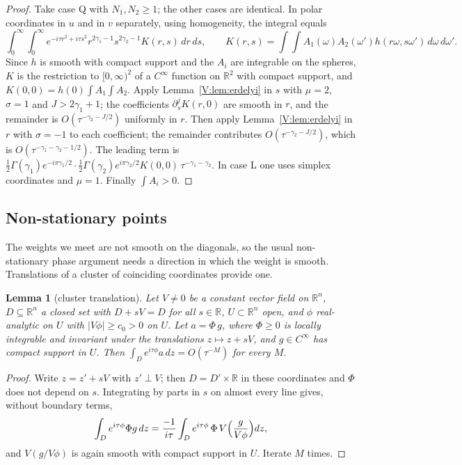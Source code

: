 \documentclass[11pt,a4paper]{article}
\newtheorem{lemma}[theorem]{Lemma}
\theoremstyle{definition}
\theoremstyle{remark}
\newcommand{\R}{\mathbb R}
\numberwithin{equation}{section}
\begin{document}
\begin{proof}
Take case Q with $N_1,N_2\ge1$; the other cases are identical. In polar coordinates in $u$ and in $v$ separately, using homogeneity, the integral equals
\[
\int_0^\infty\!\!\int_0^\infty e^{-i\tau r^2+i\tau s^2}r^{2\gamma_1-1}s^{2\gamma_2-1}K(r,s)\,dr\,ds,\qquad K(r,s)=\int\!\!\int A_1(\omega)A_2(\omega')h(r\omega,s\omega')\,d\omega\,d\omega'.
\]
Since $h$ is smooth with compact support and the $A_i$ are integrable on the spheres, $K$ is the restriction to $[0,\infty)^2$ of a $C^\infty$ function on $\R^2$ with compact support, and $K(0,0)=h(0)\int A_1\int A_2$. Apply Lemma~\ref{V:lem:erdelyi} in $s$ with $\mu=2$, $\sigma=1$ and $J>2\gamma_1+1$; the coefficients $\partial_s^jK(r,0)$ are smooth in $r$, and the remainder is $O(\tau^{-\gamma_2-J/2})$ uniformly in $r$. Then apply Lemma~\ref{V:lem:erdelyi} in $r$ with $\sigma=-1$ to each coefficient; the remainder contributes $O(\tau^{-\gamma_2-J/2})$, which is $O(\tau^{-\gamma_1-\gamma_2-1/2})$. The leading term is $\tfrac12\Gamma(\gamma_1)e^{-i\pi\gamma_1/2}\cdot\tfrac12\Gamma(\gamma_2)e^{i\pi\gamma_2/2}K(0,0)\,\tau^{-\gamma_1-\gamma_2}$. In case L one uses simplex coordinates and $\mu=1$. Finally $\int A_i>0$.
\end{proof}

\subsection{Non-stationary points}
The weights we meet are not smooth on the diagonals, so the usual non-stationary phase argument needs a direction in which the weight is smooth. Translations of a cluster of coinciding coordinates provide one.

\begin{lemma}[cluster translation]\label{V:lem:cluster}
Let $V\ne0$ be a constant vector field on $\R^n$, $D\subseteq\R^n$ a closed set with $D+sV=D$ for all $s\in\R$, $U\subset\R^n$ open, and $\phi$ real-analytic on $U$ with $|V\phi|\ge c_0>0$ on $U$. Let $a=\Phi\,g$, where $\Phi\ge0$ is locally integrable and invariant under the translations $z\mapsto z+sV$, and $g\in C^\infty$ has compact support in $U$. Then $\int_De^{i\tau\phi}a\,dz=O(\tau^{-M})$ for every $M$.
\end{lemma}

\begin{proof}
Write $z=z'+sV$ with $z'\perp V$; then $D=D'\times\R$ in these coordinates and $\Phi$ does not depend on $s$. Integrating by parts in $s$ on almost every line gives, without boundary terms,
\[
\int_De^{i\tau\phi}\Phi g\,dz=\frac{-1}{i\tau}\int_De^{i\tau\phi}\,\Phi\,V\Bigl(\frac{g}{V\phi}\Bigr)dz,
\]
and $V(g/V\phi)$ is again smooth with compact support in $U$. Iterate $M$ times.
\end{proof}
\end{document}
